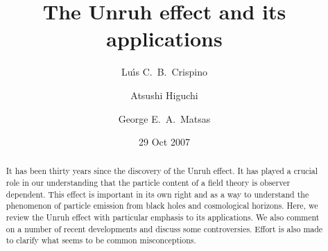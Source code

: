 \documentclass[12pt,nofootinbib,floatfix,aps,prd,showpacs,amsmath,amssymb,eqsecnum]{revtex4-2}
\begin{document}

\title{The Unruh effect and its applications}

\author{Lu\'\i s C.\ B.\ Crispino}

\author{Atsushi Higuchi}

\author{George E.\ A.\ Matsas}

\date{29 Oct 2007}



\begin{abstract}
It has been thirty years since the discovery of the Unruh effect. 
It has played a crucial role in our understanding that the particle 
content of a field theory is observer dependent. This effect is important 
in its own right and as a way 
to understand the phenomenon of particle emission from black holes 
and cosmological horizons. Here, we review the Unruh effect with 
particular emphasis to its applications. We also comment on a number 
of recent developments and discuss some controversies. Effort is also
made  to clarify what seems to be common misconceptions.
\end{abstract}

\maketitle
\end{document}
